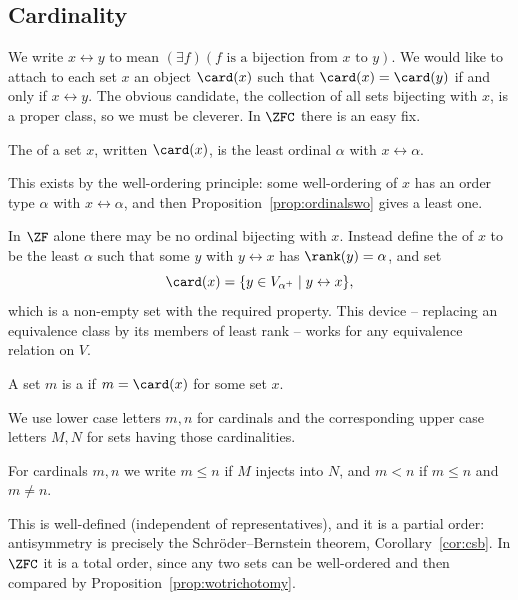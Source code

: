 \subsection{Cardinality}

We write $x \leftrightarrow y$ to mean $(\exists f)(f \text{ is a bijection from } x \text{ to } y)$. We would like to attach to each set $x$ an object $\card(x)$ such that $\card(x) = \card(y)$ if and only if $x \leftrightarrow y$. The obvious candidate, the collection of all sets bijecting with $x$, is a proper class, so we must be cleverer. In $\ZFC$ there is an easy fix.

\begin{definition}[Cardinality]
  The  of a set $x$, written $\card(x)$, is the least ordinal $\alpha$ with $x \leftrightarrow \alpha$.
\end{definition}

This exists by the well-ordering principle: some well-ordering of $x$ has an order type $\alpha$ with $x \leftrightarrow \alpha$, and then Proposition~\ref{prop:ordinalswo} gives a least one.

\begin{remark}
  In $\ZF$ alone there may be no ordinal bijecting with $x$. Instead define the  of $x$ to be the least $\alpha$ such that some $y$ with $y \leftrightarrow x$ has $\rank(y) = \alpha$, and set
  $$\card(x) = \{y \in V_{\alpha^+} \mid y \leftrightarrow x\},$$
  which is a non-empty set with the required property. This device -- replacing an equivalence class by its members of least rank -- works for any equivalence relation on $V$.
\end{remark}

\begin{definition}[Cardinal]
  A set $m$ is a  if $m = \card(x)$ for some set $x$.
\end{definition}

We use lower case letters $m, n$ for cardinals and the corresponding upper case letters $M, N$ for sets having those cardinalities.

\begin{definition}
  For cardinals $m, n$ we write $m \leq n$ if $M$ injects into $N$, and $m < n$ if $m \leq n$ and $m \neq n$.
\end{definition}

This is well-defined (independent of representatives), and it is a partial order: antisymmetry is precisely the Schr\"oder--Bernstein theorem, Corollary~\ref{cor:csb}. In $\ZFC$ it is a total order, since any two sets can be well-ordered and then compared by Proposition~\ref{prop:wotrichotomy}.

